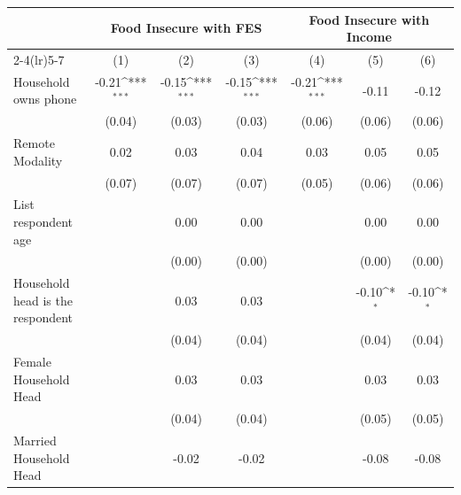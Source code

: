 {
\def\sym#1{\ifmmode^{#1}\else\(^{#1}\)\fi}
\begin{tabular}{l*{6}{c}}
\hline\hline
                    &\multicolumn{3}{c}{Food Insecure with FES}                       &\multicolumn{3}{c}{Food Insecure with Income}                    \\\cmidrule(lr){2-4}\cmidrule(lr){5-7}
                    &\multicolumn{1}{c}{(1)}         &\multicolumn{1}{c}{(2)}         &\multicolumn{1}{c}{(3)}         &\multicolumn{1}{c}{(4)}         &\multicolumn{1}{c}{(5)}         &\multicolumn{1}{c}{(6)}         \\
\hline
Household owns phone&       -0.21\sym{***}&       -0.15\sym{***}&       -0.15\sym{***}&       -0.21\sym{***}&       -0.11         &       -0.12         \\
                    &      (0.04)         &      (0.03)         &      (0.03)         &      (0.06)         &      (0.06)         &      (0.06)         \\
Remote Modality     &        0.02         &        0.03         &        0.04         &        0.03         &        0.05         &        0.05         \\
                    &      (0.07)         &      (0.07)         &      (0.07)         &      (0.05)         &      (0.06)         &      (0.06)         \\
List respondent age &                     &        0.00         &        0.00         &                     &        0.00         &        0.00         \\
                    &                     &      (0.00)         &      (0.00)         &                     &      (0.00)         &      (0.00)         \\
Household head is the respondent&                     &        0.03         &        0.03         &                     &       -0.10\sym{*}  &       -0.10\sym{*}  \\
                    &                     &      (0.04)         &      (0.04)         &                     &      (0.04)         &      (0.04)         \\
Female Household Head&                     &        0.03         &        0.03         &                     &        0.03         &        0.03         \\
                    &                     &      (0.04)         &      (0.04)         &                     &      (0.05)         &      (0.05)         \\
Married Household Head&                     &       -0.02         &       -0.02         &                     &       -0.08         &       -0.08         \\

\end{tabular}}

